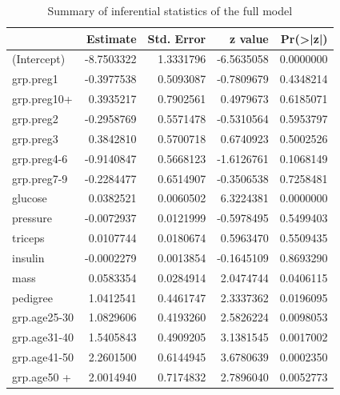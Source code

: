 \documentclass[
]{book}
\newenvironment{Shaded}{\begin{snugshade}}{\end{snugshade}}
\newcommand{\AttributeTok}[1]{\textcolor[rgb]{0.13,0.29,0.53}{#1}}
\newcommand{\CommentTok}[1]{\textcolor[rgb]{0.56,0.35,0.01}{\textit{#1}}}
\newcommand{\FunctionTok}[1]{\textcolor[rgb]{0.13,0.29,0.53}{\textbf{#1}}}
\newcommand{\NormalTok}[1]{#1}
\newcommand{\OtherTok}[1]{\textcolor[rgb]{0.56,0.35,0.01}{#1}}
\newcommand{\SpecialCharTok}[1]{\textcolor[rgb]{0.81,0.36,0.00}{\textbf{#1}}}
\newcommand{\StringTok}[1]{\textcolor[rgb]{0.31,0.60,0.02}{#1}}
\begin{document}
\begin{table}

\caption{\label{tab:unnamed-chunk-121}Summary of inferential statistics of the full model}
\centering
\begin{tabular}[t]{l|r|r|r|r}
\hline
  & Estimate & Std. Error & z value & Pr(>|z|)\\
\hline
(Intercept) & -8.7503322 & 1.3331796 & -6.5635058 & 0.0000000\\
\hline
grp.preg1 & -0.3977538 & 0.5093087 & -0.7809679 & 0.4348214\\
\hline
grp.preg10+ & 0.3935217 & 0.7902561 & 0.4979673 & 0.6185071\\
\hline
grp.preg2 & -0.2958769 & 0.5571478 & -0.5310564 & 0.5953797\\
\hline
grp.preg3 & 0.3842810 & 0.5700718 & 0.6740923 & 0.5002526\\
\hline
grp.preg4-6 & -0.9140847 & 0.5668123 & -1.6126761 & 0.1068149\\
\hline
grp.preg7-9 & -0.2284477 & 0.6514907 & -0.3506538 & 0.7258481\\
\hline
glucose & 0.0382521 & 0.0060502 & 6.3224381 & 0.0000000\\
\hline
pressure & -0.0072937 & 0.0121999 & -0.5978495 & 0.5499403\\
\hline
triceps & 0.0107744 & 0.0180674 & 0.5963470 & 0.5509435\\
\hline
insulin & -0.0002279 & 0.0013854 & -0.1645109 & 0.8693290\\
\hline
mass & 0.0583354 & 0.0284914 & 2.0474744 & 0.0406115\\
\hline
pedigree & 1.0412541 & 0.4461747 & 2.3337362 & 0.0196095\\
\hline
grp.age25-30 & 1.0829606 & 0.4193260 & 2.5826224 & 0.0098053\\
\hline
grp.age31-40 & 1.5405843 & 0.4909205 & 3.1381545 & 0.0017002\\
\hline
grp.age41-50 & 2.2601500 & 0.6144945 & 3.6780639 & 0.0002350\\
\hline
grp.age50 + & 2.0014940 & 0.7174832 & 2.7896040 & 0.0052773\\
\hline
\end{tabular}
\end{table}

\begin{Shaded}
\end{Shaded}
\end{document}
